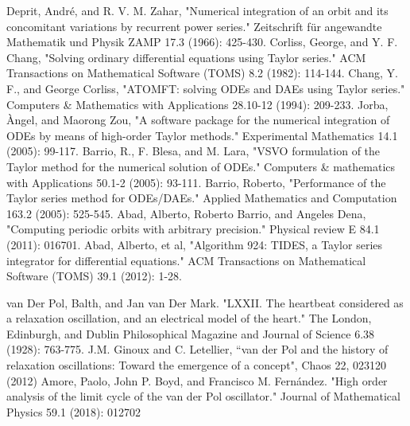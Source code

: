 \documentclass[final]{article}
\begin{document}
\begin{thebibliography}{}
	
 Deprit, André, and R. V. M. Zahar, "Numerical integration of an orbit and its concomitant variations by recurrent power series." Zeitschrift für angewandte Mathematik und Physik ZAMP 17.3 (1966): 425-430.
 Corliss, George, and Y. F. Chang, "Solving ordinary differential equations using Taylor series." ACM Transactions on Mathematical Software (TOMS) 8.2 (1982): 114-144.
 Chang, Y. F., and George Corliss, "ATOMFT: solving ODEs and DAEs using Taylor series." Computers \& Mathematics with Applications 28.10-12 (1994): 209-233.
 Jorba, Àngel, and Maorong Zou, "A software package for the numerical integration of ODEs by means of high-order Taylor methods." Experimental Mathematics 14.1 (2005): 99-117.
 Barrio, R., F. Blesa, and M. Lara, "VSVO formulation of the Taylor method for the numerical solution of ODEs." Computers \& mathematics with Applications 50.1-2 (2005): 93-111.
 Barrio, Roberto, "Performance of the Taylor series method for ODEs/DAEs." Applied Mathematics and Computation 163.2 (2005): 525-545.
  Abad, Alberto, Roberto Barrio, and Angeles Dena, "Computing periodic orbits with arbitrary precision." Physical review E 84.1 (2011): 016701.
 Abad, Alberto, et al, "Algorithm 924: TIDES, a Taylor series integrator for differential equations." ACM Transactions on Mathematical Software (TOMS) 39.1 (2012): 1-28.	

 van Der Pol, Balth, and Jan van Der Mark. "LXXII. The heartbeat considered as a relaxation oscillation, and an electrical model of the heart." The London, Edinburgh, and Dublin Philosophical Magazine and Journal of Science 6.38 (1928): 763-775.
 J.M. Ginoux and C. Letellier, ``van der Pol and the history of relaxation oscillations: Toward the emergence of a concept", Chaos 22, 023120 (2012)
 Amore, Paolo, John P. Boyd, and Francisco M. Fernández. "High order analysis of the limit cycle of the van der Pol oscillator." Journal of Mathematical Physics 59.1 (2018): 012702
	
	
		

\end{thebibliography}
\end{document}
